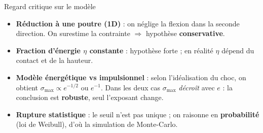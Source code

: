 \documentclass[11pt,aspectratio=169]{beamer}
\begin{document}
\begin{frame}{Regard critique sur le modèle}
  \footnotesize
  \begin{itemize}\itemsep4pt
    \item \textbf{Réduction à une poutre (1D)} : on néglige la flexion dans la
          seconde direction. On surestime la contrainte $\Rightarrow$ hypothèse
          \textbf{conservative}.
    \item \textbf{Fraction d'énergie $\eta$ constante} : hypothèse forte ; en
          réalité $\eta$ dépend du contact et de la hauteur.
    \item \textbf{Modèle énergétique vs impulsionnel} : selon l'idéalisation du
          choc, on obtient $\sigma_{\max}\propto e^{-1/2}$ ou $e^{-1}$. Dans les
          deux cas $\sigma_{\max}$ \emph{décroît} avec $e$ : la conclusion est
          \textbf{robuste}, seul l'exposant change.
    \item \textbf{Rupture statistique} : le seuil n'est pas unique ; on raisonne
          en \textbf{probabilité} (loi de Weibull), d'où la simulation de
          Monte-Carlo.
  \end{itemize}
\end{frame}
\end{document}
